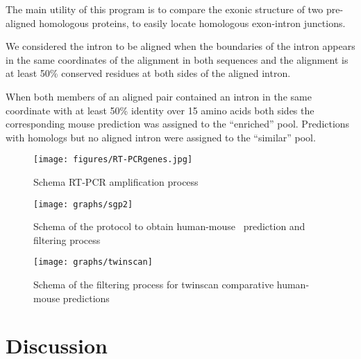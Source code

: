 The main utility of this program is to compare the exonic structure of
two pre-aligned homologous proteins, to easily locate homologous
exon-intron junctions.

We considered the intron to be aligned when the boundaries of the
intron appears in the same coordinates of the alignment in both
sequences and the alignment is at least 50\% conserved residues at
both sides of the aligned intron.

When both members of an aligned pair contained an intron in
the same coordinate with at least 50\% identity over 15 amino acids
both sides the corresponding mouse prediction was assigned to the
``enriched'' pool. Predictions with homologs but no aligned intron
were assigned to the ``similar'' pool.


\begin{figure}
\begin{center}
\texttt{[image: figures/RT-PCRgenes.jpg]}
\caption{Schema RT-PCR amplification process}
\end{center}
\end{figure}



\begin{figure}
\begin{center}
\texttt{[image: graphs/sgp2]}
\caption{Schema of the protocol to obtain human-mouse \sgp\ prediction 
and filtering process}
\end{center}
\end{figure}

\begin{figure}
\begin{center}
\texttt{[image: graphs/twinscan]}
\caption{Schema of the filtering process for twinscan comparative 
human-mouse predictions}
\end{center}
\end{figure}

% 





\chapter{Discussion}


